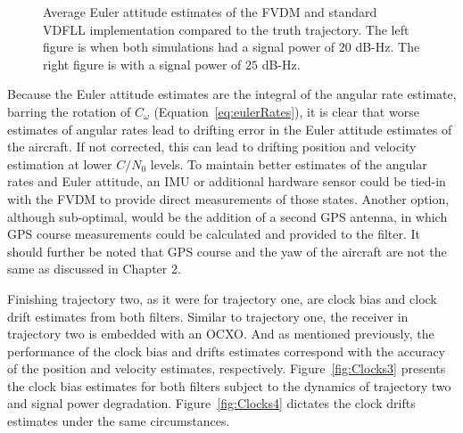\begin{figure}[!ht]
\begin{subfigure}{.45\textwidth}
    \end{subfigure}
    \caption{Average Euler attitude estimates of the FVDM and standard VDFLL implementation compared to the truth trajectory. The left figure is when both simulations had a signal power of \(20\) dB-Hz. The right figure is with a signal power of \(25\) dB-Hz.}\label{fig:EULER}
\end{figure}

Because the Euler attitude estimates are the integral of the angular rate estimate, barring the rotation of \(C_{\omega}\) (Equation~\ref{eq:eulerRates}), it is clear that worse estimates of angular rates lead to drifting error in the Euler attitude estimates of the aircraft. If not corrected, this can lead to drifting position and velocity estimation at lower \(C/N_0\) levels. To maintain better estimates of the angular rates and Euler attitude, an IMU or additional hardware sensor could be tied-in with the FVDM to provide direct measurements of those states. Another option, although sub-optimal, would be the addition of a second GPS antenna, in which GPS course measurements could be calculated and provided to the filter. It should further be noted that GPS course and the yaw of the aircraft are not the same as discussed in Chapter 2.

Finishing trajectory two, as it were for trajectory one, are clock bias and clock drift estimates from both filters. Similar to trajectory one, the receiver in trajectory two is embedded with an OCXO\@. And as mentioned previously, the performance of the clock bias and drifts estimates correspond with the accuracy of the position and velocity estimates, respectively. Figure~\ref{fig:Clocks3} presents the clock bias estimates for both filters subject to the dynamics of trajectory two and signal power degradation. Figure~\ref{fig:Clocks4} dictates the clock drifts estimates under the same circumstances.


